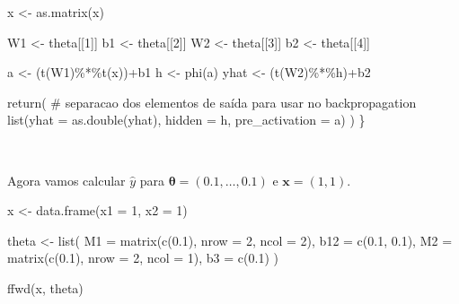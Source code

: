 \documentclass[
  a4paperpaper,
]{article}
\newenvironment{Shaded}{\begin{snugshade}}{\end{snugshade}}
\newcommand{\AttributeTok}[1]{\textcolor[rgb]{0.40,0.45,0.13}{#1}}
\newcommand{\CommentTok}[1]{\textcolor[rgb]{0.37,0.37,0.37}{#1}}
\newcommand{\DecValTok}[1]{\textcolor[rgb]{0.68,0.00,0.00}{#1}}
\newcommand{\FloatTok}[1]{\textcolor[rgb]{0.68,0.00,0.00}{#1}}
\newcommand{\FunctionTok}[1]{\textcolor[rgb]{0.28,0.35,0.67}{#1}}
\newcommand{\NormalTok}[1]{\textcolor[rgb]{0.00,0.23,0.31}{#1}}
\newcommand{\OtherTok}[1]{\textcolor[rgb]{0.00,0.23,0.31}{#1}}
\newcommand{\SpecialCharTok}[1]{\textcolor[rgb]{0.37,0.37,0.37}{#1}}
\begin{document}
\begin{Shaded}
\begin{Highlighting}[]
\NormalTok{  x }\OtherTok{\textless{}{-}} \FunctionTok{as.matrix}\NormalTok{(x)}
  
\NormalTok{  W1 }\OtherTok{\textless{}{-}}\NormalTok{ theta[[}\DecValTok{1}\NormalTok{]]}
\NormalTok{  b1 }\OtherTok{\textless{}{-}}\NormalTok{ theta[[}\DecValTok{2}\NormalTok{]]}
\NormalTok{  W2 }\OtherTok{\textless{}{-}}\NormalTok{ theta[[}\DecValTok{3}\NormalTok{]]}
\NormalTok{  b2 }\OtherTok{\textless{}{-}}\NormalTok{ theta[[}\DecValTok{4}\NormalTok{]]}
  
\NormalTok{  a }\OtherTok{\textless{}{-}}\NormalTok{ (}\FunctionTok{t}\NormalTok{(W1)}\SpecialCharTok{\%*\%}\FunctionTok{t}\NormalTok{(x))}\SpecialCharTok{+}\NormalTok{b1}
\NormalTok{  h }\OtherTok{\textless{}{-}} \FunctionTok{phi}\NormalTok{(a)}
\NormalTok{  yhat }\OtherTok{\textless{}{-}}\NormalTok{ (}\FunctionTok{t}\NormalTok{(W2)}\SpecialCharTok{\%*\%}\NormalTok{h)}\SpecialCharTok{+}\NormalTok{b2}
  
  \FunctionTok{return}\NormalTok{( }\CommentTok{\# separacao dos elementos de saída para usar no backpropagation}
    \FunctionTok{list}\NormalTok{(}\AttributeTok{yhat =} \FunctionTok{as.double}\NormalTok{(yhat),}
         \AttributeTok{hidden =}\NormalTok{ h,}
         \AttributeTok{pre\_activation =}\NormalTok{ a)}
\NormalTok{  )}
\NormalTok{\}}
\end{Highlighting}
\end{Shaded}

~

Agora vamos calcular \(\hat{y}\) para
\(\boldsymbol{\theta} = (0.1, \dots , 0.1)\) e
\(\boldsymbol{x} = (1, 1)\).

\begin{Shaded}
\begin{Highlighting}[]
\NormalTok{x }\OtherTok{\textless{}{-}} \FunctionTok{data.frame}\NormalTok{(}\AttributeTok{x1 =} \DecValTok{1}\NormalTok{, }\AttributeTok{x2 =} \DecValTok{1}\NormalTok{)}

\NormalTok{theta }\OtherTok{\textless{}{-}} \FunctionTok{list}\NormalTok{(}
  \AttributeTok{M1 =} \FunctionTok{matrix}\NormalTok{(}\FunctionTok{c}\NormalTok{(}\FloatTok{0.1}\NormalTok{), }\AttributeTok{nrow =} \DecValTok{2}\NormalTok{, }\AttributeTok{ncol =} \DecValTok{2}\NormalTok{), }
  \AttributeTok{b12 =} \FunctionTok{c}\NormalTok{(}\FloatTok{0.1}\NormalTok{, }\FloatTok{0.1}\NormalTok{), }
  \AttributeTok{M2 =} \FunctionTok{matrix}\NormalTok{(}\FunctionTok{c}\NormalTok{(}\FloatTok{0.1}\NormalTok{), }\AttributeTok{nrow =} \DecValTok{2}\NormalTok{, }\AttributeTok{ncol =} \DecValTok{1}\NormalTok{), }
  \AttributeTok{b3 =} \FunctionTok{c}\NormalTok{(}\FloatTok{0.1}\NormalTok{) }
\NormalTok{)}

\FunctionTok{ffwd}\NormalTok{(x, theta)}
\end{Highlighting}
\end{Shaded}
\end{document}
